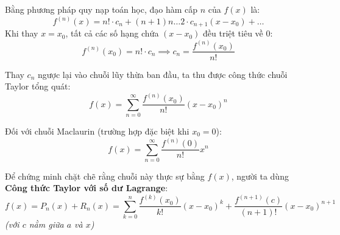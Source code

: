 \documentclass[12pt]{article}
\theoremstyle{definition}
\theoremstyle{remark}
\begin{document}
Bằng phương pháp quy nạp toán học, đạo hàm cấp $n$ của $f(x)$ là:
\[
f^{(n)}(x) = n! \cdot c_n + (n+1)n\dots 2 \cdot c_{n+1}(x-x_0) + \dots
\]
Khi thay $x = x_0$, tất cả các số hạng chứa $(x-x_0)$ đều triệt tiêu về $0$:
\[
f^{(n)}(x_0) = n! \cdot c_n \implies c_n = \frac{f^{(n)}(x_0)}{n!}
\]


Thay $c_n$ ngược lại vào chuỗi lũy thừa ban đầu, ta thu được công thức chuỗi Taylor tổng quát:
\[
f(x) = \sum_{n=0}^{\infty} \frac{f^{(n)}(x_0)}{n!} (x-x_0)^n
\]

Đối với chuỗi Maclaurin (trường hợp đặc biệt khi $x_0 = 0$):
\[
f(x) = \sum_{n=0}^{\infty} \frac{f^{(n)}(0)}{n!} x^n
\]


Để chứng minh chặt chẽ rằng chuỗi này thực sự bằng $f(x)$, người ta dùng \textbf{Công thức Taylor với số dư Lagrange}:
\[
f(x) = P_n(x) + R_n(x) = \sum_{k=0}^{n} \frac{f^{(k)}(x_0)}{k!} (x-x_0)^k + \frac{f^{(n+1)}(c)}{(n+1)!} (x-x_0)^{n+1}
\]
\textit{(với $c$ nằm giữa $a$ và $x$)}
\end{document}
